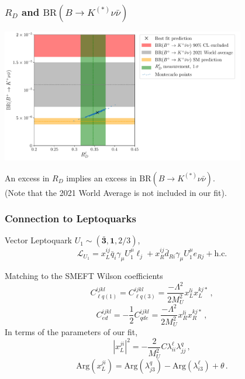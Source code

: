 \documentclass[mathserif, 10pt]{beamer}
\begin{document}
\begin{frame}
    \frametitle{$R_D$ and $\mathrm{BR}(B\to K^{(*)}\nu\bar{\nu})$}

    \begin{center}
        \includegraphics[width=0.8\textwidth]{figures/RD_BKnunu.pdf}
    \end{center}

    An excess in $R_D$ implies an excess in $\mathrm{BR}(B\to K^{(*)}\nu\bar{\nu})$. \\(Note that the {\color{gray}2021 World Average} is not included in our fit).

\end{frame}


\begin{frame}
    \frametitle{Connection to Leptoquarks}

    Vector Leptoquark $U_1 \sim (\bar{\mathbf{3}}, \mathbf{1}, 2/3)$,
    $$\mathcal{L}_{U_1} = x_L^{ij} \bar{q}_i \gamma_\mu U_1^\mu \ell_j + x_R^{ij} \bar{d}_{Ri} \gamma_\mu U_1^\mu e_{Rj} + \mathrm{h.c.} $$

    Matching to the SMEFT Wilson coefficients
    $$C_{\ell q(1)}^{ijkl} = C_{\ell q(3)}^{ijkl} = \frac{-\Lambda^2}{2M_U^2}x_L^{li}x_L^{kj*}\,,$$
    $$C_{ed}^{ijkl} = -\frac{1}{2}C_{qde}^{ijkl} = \frac{-\Lambda^2}{2M_U^2}x_R^{li}x_R^{kj*}\,,$$
    In terms of the parameters of our fit,
    $$|x_L^{ji}|^2 = -\frac{2}{M_U^2}C\lambda^\ell_{ii}\lambda^q_{jj}\,,$$
    $$\mathrm{Arg}(x_L^{ji}) = \mathrm{Arg}(\lambda_{j3}^q)-\mathrm{Arg}(\lambda_{i3}^\ell) + \theta\,.$$ %

\end{frame}
\end{document}
